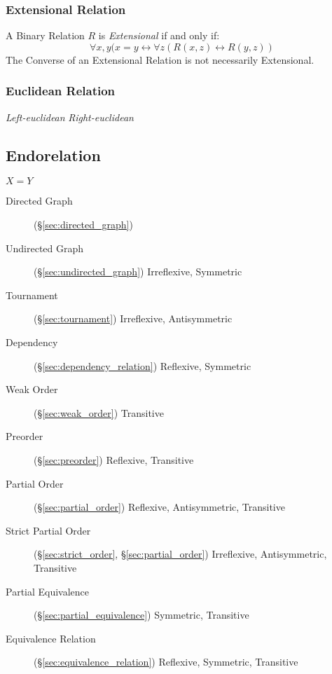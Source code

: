 \subsubsection{Extensional Relation}\label{sec:extensional_relation}

A Binary Relation $R$ is \emph{Extensional} if and only if:
\[
  \forall x,y (x = y \leftrightarrow
    \forall z (R(x,z) \leftrightarrow R(y,z))
\]
The Converse of an Extensional Relation is not necessarily
Extensional.

\subsubsection{Euclidean Relation}\label{sec:euclidean_relation}

\emph{Left-euclidean} \emph{Right-euclidean}



\subsection{Endorelation}\label{sec:endorelation}

$X = Y$

\begin{description}
\item [Directed Graph] (\S\ref{sec:directed_graph})

\item [Undirected Graph] (\S\ref{sec:undirected_graph}) Irreflexive,
  Symmetric

\item [Tournament] (\S\ref{sec:tournament}) Irreflexive, Antisymmetric

\item [Dependency] (\S\ref{sec:dependency_relation}) Reflexive,
  Symmetric

\item [Weak Order] (\S\ref{sec:weak_order}) Transitive

\item [Preorder] (\S\ref{sec:preorder}) Reflexive, Transitive

\item [Partial Order] (\S\ref{sec:partial_order}) Reflexive,
  Antisymmetric, Transitive

\item [Strict Partial Order] (\S\ref{sec:strict_order},
  \S\ref{sec:partial_order}) Irreflexive, Antisymmetric, Transitive

\item [Partial Equivalence] (\S\ref{sec:partial_equivalence})
  Symmetric, Transitive

\item [Equivalence Relation] (\S\ref{sec:equivalence_relation})
  Reflexive, Symmetric, Transitive

\end{description}

